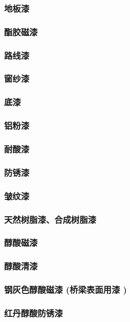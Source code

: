 \documentclass[UTF8]{../../ApplicationUniverse}
\begin{document}
    \subsubsection{地板漆}
    \subsubsection{酯胶磁漆}
    \subsubsection{路线漆}
    \subsubsection{窗纱漆}
    \subsubsection{底漆}
    \subsubsection{铝粉漆}
    \subsubsection{耐酸漆}
    \subsubsection{防锈漆}
    \subsubsection{皱纹漆}
\subsubsection{天然树脂漆、合成树脂漆}
    \subsubsection{醇酸磁漆}
    \subsubsection{醇酸清漆}
    \subsubsection{钢灰色醇酸磁漆 (桥梁表面用漆 )}
    \subsubsection{红丹醇酸防锈漆}
\end{document}

